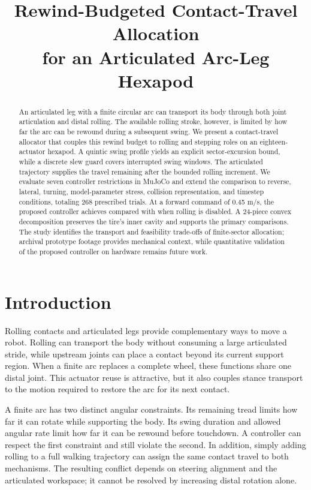 \documentclass[letterpaper,10pt,conference]{ieeeconf}
\title{\LARGE\bf Rewind-Budgeted Contact-Travel Allocation\\for an Articulated Arc-Leg Hexapod}
\author{\mbox{}}
\begin{document}
\maketitle\thispagestyle{empty}\pagestyle{empty}
\begin{abstract}
An articulated leg with a finite circular arc can transport its body through both joint articulation and distal rolling. The available rolling stroke, however, is limited by how far the arc can be rewound during a subsequent swing. We present a contact-travel allocator that couples this rewind budget to rolling and stepping roles on an eighteen-actuator hexapod. A quintic swing profile yields an explicit sector-excursion bound, while a discrete slew guard covers interrupted swing windows. The articulated trajectory supplies the travel remaining after the bounded rolling increment. We evaluate seven controller restrictions in MuJoCo and extend the comparison to reverse, lateral, turning, model-parameter stress, collision representation, and timestep conditions, totaling 268 prescribed trials. At a forward command of 0.45 m/s, the proposed controller achieves \BudgetSpeed{} compared with \WalkSpeed{} when rolling is disabled. \AbstractRateResult{} A 24-piece convex decomposition preserves the tire's inner cavity and supports the primary comparisons. The study identifies the transport and feasibility trade-offs of finite-sector allocation; archival prototype footage provides mechanical context, while quantitative validation of the proposed controller on hardware remains future work.
\end{abstract}

\section{Introduction}
Rolling contacts and articulated legs provide complementary ways to move a robot. Rolling can transport the body without consuming a large articulated stride, while upstream joints can place a contact beyond its current support region. When a finite arc replaces a complete wheel, these functions share one distal joint. This actuator reuse is attractive, but it also couples stance transport to the motion required to restore the arc for its next contact.

A finite arc has two distinct angular constraints. Its remaining tread limits how far it can rotate while supporting the body. Its swing duration and allowed angular rate limit how far it can be rewound before touchdown. A controller can respect the first constraint and still violate the second. In addition, simply adding rolling to a full walking trajectory can assign the same contact travel to both mechanisms. The resulting conflict depends on steering alignment and the articulated workspace; it cannot be resolved by increasing distal rotation alone.
\end{document}
